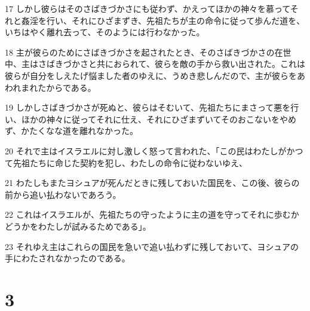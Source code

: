 \par 17 しかし彼らはそのさばきづかさにも従わず、かえってほかの神々を慕ってそれと姦淫を行い、それにひざまずき、先祖たちが主の命令に従って歩んだ道を、いちはやく離れ去って、そのようには行わなかった。
\par 18 主が彼らのためにさばきづかさを起されたとき、そのさばきづかさの在世中、主はさばきづかさと共におられて、彼らを敵の手から救い出された。これは彼らが自分をしえたげ悩ました者のゆえに、うめき悲しんだので、主が彼らをあわれまれたからである。
\par 19 しかしさばきづかさが死ぬと、彼らはそむいて、先祖たちにまさって悪を行い、ほかの神々に従ってそれに仕え、それにひざまずいてそのおこないをやめず、かたくなな道を離れなかった。
\par 20 それで主はイスラエルに対し激しく怒って言われた、「この民はわたしがかつて先祖たちに命じた契約を犯し、わたしの命令に従わないゆえ、
\par 21 わたしもまたヨシュアが死んだときに残しておいた国民を、この後、彼らの前から追い払わないであろう。
\par 22 これはイスラエルが、先祖たちの守ったように主の道を守ってそれに歩むかどうかをわたしが試みるためである」。
\par 23 それゆえ主はこれらの国民を急いで追い払わずに残しておいて、ヨシュアの手にわたされなかったのである。

\chapter{3}

